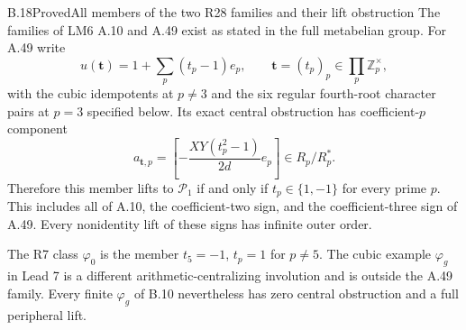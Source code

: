 \begin{statement}{B.18}{Proved}{All members of the two R28 families and their lift obstruction}
The families of LM6 A.10 and A.49 exist as stated in the full
metabelian group. For A.49 write
\[
       u(\mathbf t)=1+\sum_p(t_p-1)e_p,
       \qquad \mathbf t=(t_p)_p\in\prod_p\mathbb Z_p^\times,
\]
with the cubic idempotents at $p\ne3$ and the six regular
fourth-root character pairs at $p=3$ specified below.
Its exact central obstruction has coefficient-$p$ component
\[
       a_{\mathbf t,p}
         =\left[-\frac{XY(t_p^2-1)}{2d}e_p\right]
           \in R_p/R_p^*.
 \tag{B.18.1}
\]
Therefore this member lifts to $\mathcal P_1$ if and only if
$t_p\in\{1,-1\}$ for every prime $p$. This includes all of A.10,
the coefficient-two sign, and the coefficient-three sign of A.49.
Every nonidentity lift of these signs has infinite outer order.

The R7 class $\varphi_0$ is the member $t_5=-1$, $t_p=1$ for
$p\ne5$. The cubic example $\varphi_g$ in Lead 7 is a different
arithmetic-centralizing involution and is outside the A.49 family.
Every finite $\varphi_g$ of B.10 nevertheless has zero central
obstruction and a full peripheral lift.
\end{statement}
